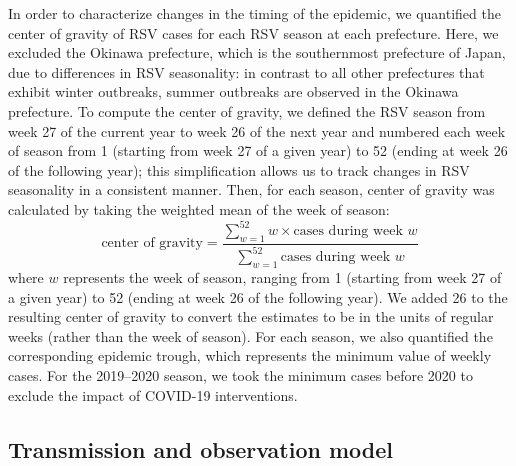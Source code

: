 \documentclass[12pt]{article}
\begin{document}
In order to characterize changes in the timing of the epidemic, we quantified the center of gravity of RSV cases for each RSV season at each prefecture.
Here, we excluded the Okinawa prefecture, which is the southernmost prefecture of Japan, due to differences in RSV seasonality:
in contrast to all other prefectures that exhibit winter outbreaks, summer outbreaks are observed in the Okinawa prefecture.
To compute the center of gravity, we defined the RSV season from week 27 of the current year to week 26 of the next year and numbered each week of season from 1 (starting from week 27 of a given year) to 52 (ending at week 26 of the following year);
this simplification allows us to track changes in RSV seasonality in a consistent manner.
Then, for each season, center of gravity was calculated by taking the weighted mean of the week of season:
\begin{equation}
\textrm{center of gravity}=\frac{\sum_{w=1}^{52} w \times \textrm{cases during week }w}{\sum_{w=1}^{52} \textrm{cases during week }w}
\end{equation}
where $w$ represents the week of season, ranging from 1 (starting from week 27 of a given year) to 52 (ending at week 26 of the following year).
We added 26 to the resulting center of gravity to convert the estimates to be in the units of regular weeks (rather than the week of season).
For each season, we also quantified the corresponding epidemic trough, which represents the minimum value of weekly cases.
For the 2019--2020 season, we took the minimum cases before 2020 to exclude the impact of COVID-19 interventions.

\subsection*{Transmission and observation model}
\end{document}
